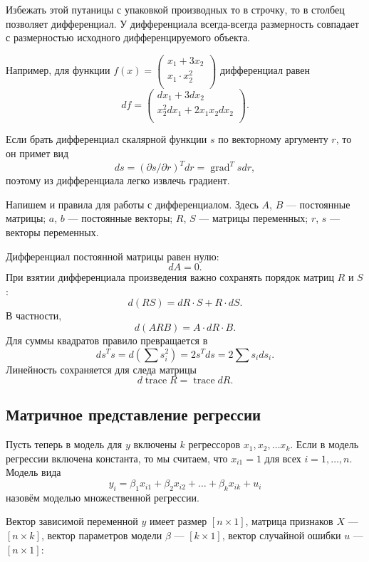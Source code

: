 \documentclass[12pt]{article}
\DeclareMathOperator{\grad}{grad}
\DeclareMathOperator{\trace}{trace}
\begin{document}
Избежать этой путаницы с упаковкой производных то в строчку, то в столбец позволяет дифференциал. 
У дифференциала всегда-всегда размерность совпадает с размерностью исходного дифференцируемого объекта.

Например, для функции $f(x) = \begin{pmatrix}
    x_1 + 3x_2 \\
    x_1 \cdot x_2^2  \\
\end{pmatrix}$ дифференциал равен
\[
df = \begin{pmatrix}
    dx_1 +  3  dx_2 \\
    x_2^2 dx_1 +  2x_1 x_2 dx_2 \\
\end{pmatrix}.
\]

Если брать дифференциал скалярной функции $s$ по векторному аргументу $r$, то он примет вид
\[
ds = (\partial s/\partial r)^T dr = \grad^T s dr,
\]
поэтому из дифференциала легко извлечь градиент. 


Напишем и правила для работы с дифференциалом.
Здесь $A$, $B$ — постоянные матрицы; $a$, $b$ — постоянные векторы; $R$, $S$ — матрицы переменных; $r$, $s$ — векторы переменных.

Дифференциал постоянной матрицы равен нулю:
\[
dA = 0.
\]
При взятии дифференциала произведения важно  сохранять порядок матриц $R$ и $S$:
\[
d(RS) = dR \cdot S + R \cdot dS.
\]
В частности,
\[
d(ARB) = A \cdot dR \cdot B.
\]
Для суммы квадратов правило превращается в 
\[
d s^T s = d(\sum s_i^2) = 2s^T ds = 2 \sum s_i ds_i.
\]
Линейность сохраняется для следа матрицы
\[
d \trace R = \trace dR.
\]


\subsection{Матричное представление регрессии}
Пусть теперь в модель для $y$ включены $k$ регрессоров $x_1, x_2, \dots x_k$. 
Если в модель регрессии включена константа, то мы считаем, что $x_{i1}=1$ для всех $i=1, \dots, n$. 
Модель вида
\[
y_i = \beta_1 x_{i1} + \beta_2 x_{i2} + \dots + \beta_k x_{ik} + u_i
\]
назовём моделью множественной регрессии.

Вектор зависимой переменной $y$ имеет размер $[n \times 1]$, матрица признаков $X$ —  $[n \times k]$, вектор параметров модели $\beta$ — $[k \times 1]$, вектор случайной ошибки $u$ — $[n \times 1]$:
\end{document}
